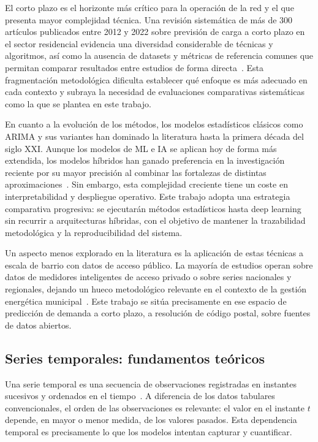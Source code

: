 \documentclass[12pt, a4paper]{article}
\begin{document}
El corto plazo es el horizonte más crítico para la operación de la red y el que presenta mayor complejidad técnica. Una revisión sistemática de más de 300 artículos publicados entre 2012 y 2022 sobre previsión de carga a corto plazo en el sector residencial evidencia una diversidad considerable de técnicas y algoritmos, así como la ausencia de datasets y métricas de referencia comunes que permitan comparar resultados entre estudios de forma directa~\cite{melicio2023}. Esta fragmentación metodológica dificulta establecer qué enfoque es más adecuado en cada contexto y subraya la necesidad de evaluaciones comparativas sistemáticas como la que se plantea en este trabajo.

En cuanto a la evolución de los métodos, los modelos estadísticos clásicos como ARIMA y sus variantes han dominado la literatura hasta la primera década del siglo XXI. Aunque los modelos de ML e IA se aplican hoy de forma más extendida, los modelos híbridos han ganado preferencia en la investigación reciente por su mayor precisión al combinar las fortalezas de distintas aproximaciones~\cite{ugbehe2025}. Sin embargo, esta complejidad creciente tiene un coste en interpretabilidad y despliegue operativo. Este trabajo adopta una estrategia comparativa progresiva: se ejecutarán métodos estadísticos hasta deep learning sin recurrir a arquitecturas híbridas, con el objetivo de mantener la trazabilidad metodológica y la reproducibilidad del sistema.

Un aspecto menos explorado en la literatura es la aplicación de estas técnicas a escala de barrio con datos de acceso público. La mayoría de estudios operan sobre datos de medidores inteligentes de acceso privado o sobre series nacionales y regionales, dejando un hueco metodológico relevante en el contexto de la gestión energética municipal~\cite{jiang2024}. Este trabajo se sitúa precisamente en ese espacio de predicción de demanda a corto plazo, a resolución de código postal, sobre fuentes de datos abiertos.

\subsection{Series temporales: fundamentos teóricos}


Una serie temporal es una secuencia de observaciones registradas en instantes sucesivos y ordenados en el tiempo~\cite{hyndman2021}. A diferencia de los datos tabulares convencionales, el orden de las observaciones es relevante: el valor en el instante $t$ depende, en mayor o menor medida, de los valores pasados. Esta dependencia temporal es precisamente lo que los modelos intentan capturar y cuantificar.
\end{document}
